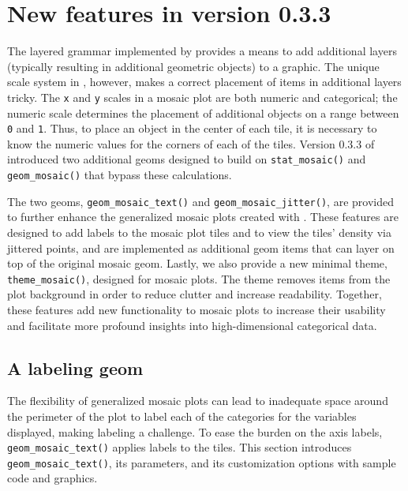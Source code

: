 \hypertarget{new-features-in-version-0.3.3}{%
\section*{\texorpdfstring{New features in  version 0.3.3}{New features in  version 0.3.3}}\label{new-features-in-version-0.3.3}}

The layered grammar implemented by  provides a means to add additional layers (typically resulting in additional geometric objects) to a graphic. The unique scale system in , however, makes a correct placement of items in additional layers tricky. The \texttt{x} and \texttt{y} scales in a mosaic plot are both numeric and categorical; the numeric scale determines the placement of additional objects on a range between \texttt{0} and \texttt{1}. Thus, to place an object in the center of each tile, it is necessary to know the numeric values for the corners of each of the tiles. Version 0.3.3 of  introduced two additional geoms designed to build on \texttt{stat\_mosaic()} and \texttt{geom\_mosaic()} that bypass these calculations.

The two geoms, \texttt{geom\_mosaic\_text()} and \texttt{geom\_mosaic\_jitter()}, are provided to further enhance the generalized mosaic plots created with . These features are designed to add labels to the mosaic plot tiles and to view the tiles' density via jittered points, and are implemented as additional geom items that can layer on top of the original mosaic geom. Lastly, we also provide a new minimal theme, \texttt{theme\_mosaic()}, designed for mosaic plots. The theme removes items from the plot background in order to reduce clutter and increase readability. Together, these features add new functionality to mosaic plots to increase their usability and facilitate more profound insights into high-dimensional categorical data.

\hypertarget{a-labeling-geom}{%
\subsection*{A labeling geom}\label{a-labeling-geom}}

The flexibility of generalized mosaic plots can lead to inadequate space around the perimeter of the plot to label each of the categories for the variables displayed, making labeling a challenge. To ease the burden on the axis labels, \texttt{geom\_mosaic\_text()} applies labels to the tiles. This section introduces \texttt{geom\_mosaic\_text()}, its parameters, and its customization options with sample code and graphics.

